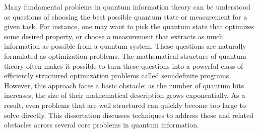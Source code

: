 
Many fundamental problems in quantum information theory can be understood as questions of choosing the best possible quantum state or measurement for a given task. 
For instance, one may want to pick the quantum state that optimizes some desired property, or choose a measurement that extracts as much information as possible from a quantum system. 
These questions are naturally formulated as optimization problems. %
%
The mathematical structure of quantum theory often makes it possible to turn these questions into a powerful class of efficiently structured optimization problems called semidefinite programs.
However, this approach faces a basic obstacle: as the number of quantum bits increases, the size of their mathematical description grows exponentially. 
As a result, even problems that are well structured can quickly become too large to solve directly.
%
This dissertation discusses techniques to address these and related obstacles across several core problems in quantum information.


